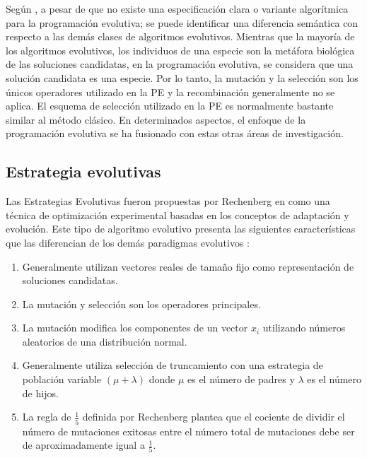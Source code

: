 Según \cite{weise2009global}, a pesar de que no existe una especificación clara o variante algorítmica para la programación evolutiva; se puede identificar una diferencia semántica con respecto a las demás clases de algoritmos evolutivos. Mientras que la mayoría de los algoritmos evolutivos, los individuos de una especie son la metáfora biológica de las soluciones candidatas, en la programación evolutiva, se considera que una solución candidata es una especie. Por lo tanto, la mutación y la selección son los únicos operadores utilizado en la PE y la recombinación generalmente no se aplica. El esquema de selección utilizado en la PE es normalmente bastante similar al método clásico. En determinados aspectos, el enfoque de la programación evolutiva se ha fusionado con estas otras áreas de investigación.


\subsection{Estrategia evolutivas}
Las Estrategias Evolutivas fueron propuestas por Rechenberg en \cite{rechenberg1973evolution} como una técnica de optimización experimental basadas en los conceptos de adaptación y evolución. Este tipo de algoritmo evolutivo presenta las siguientes características que las diferencian de los demás paradigmas evolutivos \cite{schwefel1995contemporary} \cite{weise2009global}:
\begin{enumerate}
\item Generalmente utilizan vectores reales de tamaño fijo como representación de soluciones candidatas.
\item La mutación y selección son los operadores principales.
\item La mutación modifica los componentes de un vector $x_i$ utilizando números aleatorios de una distribución normal.
\item Generalmente utiliza selección de truncamiento con una estrategia de población variable 
$(\mu+\lambda)$ donde $\mu$ es el número de padres y $\lambda$ es el número de hijos.
\item La regla de $\frac{1}{5}$ definida por Rechenberg plantea que el cociente de dividir el número de mutaciones exitosas entre el número total de mutaciones debe ser de aproximadamente igual a $\frac{1}{5}$. 
\end{enumerate}


